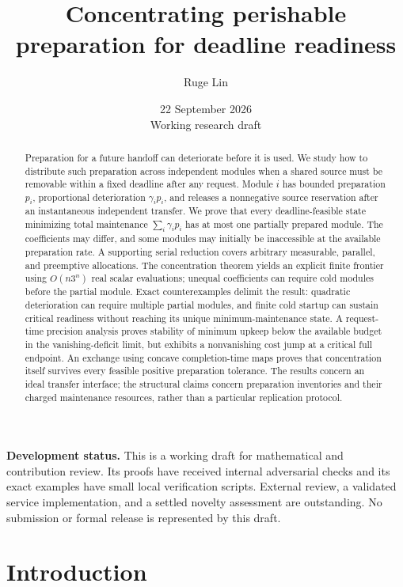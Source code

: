 \documentclass[11pt]{article}
\title{Concentrating perishable preparation for deadline readiness}
\author{Ruge Lin}
\date{22 September 2026\\[4pt]\small Working research draft}
\theoremstyle{remark}
\begin{document}
\maketitle
\begin{abstract}
Preparation for a future handoff can deteriorate before it is used. We study
how to distribute such preparation across independent modules when a shared
source must be removable within a fixed deadline after any request. Module
$i$ has bounded preparation $p_i$, proportional deterioration $\gamma_i p_i$,
and releases a nonnegative source reservation after an instantaneous
independent transfer. We prove that every deadline-feasible state minimizing
total maintenance $\sum_i\gamma_i p_i$ has at most one partially prepared
module. The coefficients may differ, and some modules may initially be
inaccessible at the available preparation rate. A supporting serial reduction
covers arbitrary measurable, parallel, and preemptive allocations. The
concentration theorem yields an explicit finite frontier using
$O(n3^n)$ real scalar evaluations; unequal coefficients can require cold
modules before the partial module. Exact counterexamples delimit the result:
quadratic deterioration can require multiple partial modules, and finite
cold startup can sustain critical readiness without reaching its unique
minimum-maintenance state. A request-time precision analysis proves stability
of minimum upkeep below the available budget in the vanishing-deficit limit,
but exhibits a nonvanishing cost jump at a critical full endpoint.
An exchange using concave completion-time maps proves that concentration
itself survives every feasible positive preparation tolerance.
The results concern an ideal transfer interface;
the structural claims concern preparation inventories and their charged
maintenance resources, rather than a particular replication protocol.
\end{abstract}

\noindent\textbf{Development status.}
This is a working draft for mathematical and contribution review.
Its proofs have received internal adversarial checks and its exact examples
have small local verification scripts. External review, a validated service
implementation, and a settled novelty assessment are outstanding. No
submission or formal release is represented by this draft.

\section{Introduction}
\end{document}

